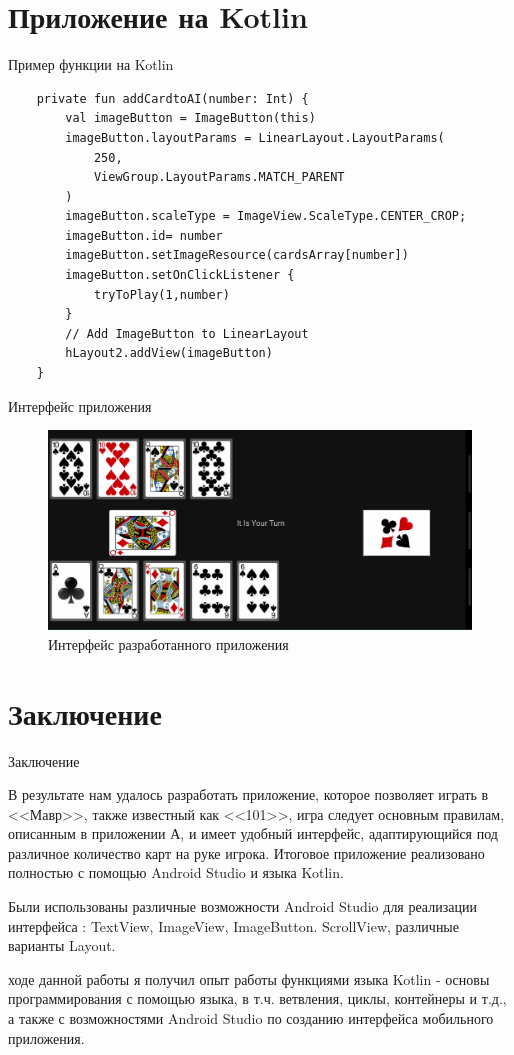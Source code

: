 \documentclass[aspectratio=169,xcolor=dvipsnames]{beamer}
\begin{document}
\section{Приложение на Kotlin}
\begin{frame}[fragile]{Пример функции на Kotlin}
\begin{verbatim}
    private fun addCardtoAI(number: Int) {
        val imageButton = ImageButton(this)
        imageButton.layoutParams = LinearLayout.LayoutParams(
            250,
            ViewGroup.LayoutParams.MATCH_PARENT
        )
        imageButton.scaleType = ImageView.ScaleType.CENTER_CROP;
        imageButton.id= number
        imageButton.setImageResource(cardsArray[number])
        imageButton.setOnClickListener {
            tryToPlay(1,number)
        }
        // Add ImageButton to LinearLayout
        hLayout2.addView(imageButton)
    }
\end{verbatim}
    
\end{frame}
\begin{frame}{Интерфейс приложения}
    \begin{figure}
        \centering
        \includegraphics[scale=0.4]{interface.png}
        \caption{Интерфейс разработанного приложения}
        \label{fig:my_label}
    \end{figure}
\end{frame}

\section{Заключение}
\begin{frame}{Заключение}
\begin{justifying}
В результате нам удалось разработать приложение, которое позволяет играть в <<Мавр>>, также известный как <<101>>, игра следует основным правилам, описанным в приложении А, и имеет удобный интерфейс, адаптирующийся под различное количество карт на руке игрока. Итоговое приложение реализовано полностью с помощью Android Studio и языка Kotlin. 

Были использованы различные возможности Android Studio для реализации интерфейса : TextView, ImageView, ImageButton. ScrollView, различные варианты Layout.

 ходе данной работы я получил опыт работы функциями языка Kotlin - основы программирования с помощью языка, в т.ч. ветвления, циклы, контейнеры и т.д., а также с возможностями Android Studio по созданию интерфейса мобильного приложения.
\end{justifying}
\end{frame}

\end{document}
